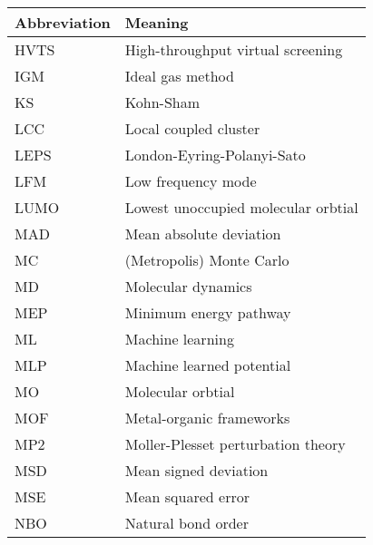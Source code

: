 \documentclass[../main.tex]{subfiles}
\begin{document}
\begin{table}[h!]
\def\arraystretch{2.0}
\begin{tabularx}{\textwidth}{YY}
Abbreviation & Meaning \\
\hline
HVTS	&	High-throughput virtual screening	\\
IGM	&	Ideal gas method	\\
KS	&	Kohn-Sham	\\
LCC	&	Local coupled cluster	\\
LEPS	&	London-Eyring-Polanyi-Sato	\\
LFM	&	Low frequency mode	\\
LUMO	&	Lowest unoccupied molecular orbtial	\\
MAD	&	Mean absolute deviation	\\
MC	&	(Metropolis) Monte Carlo	\\
MD	&	Molecular dynamics	\\
MEP	&	Minimum energy pathway	\\
ML	&	Machine learning	\\
MLP	&	Machine learned potential	\\
MO	&	Molecular orbtial	\\
MOF	&	Metal-organic frameworks	\\
MP2	&	Moller-Plesset perturbation theory	\\
MSD	&	Mean signed deviation	\\
MSE	&	Mean squared error	\\
NBO	&	Natural bond order	\\
\end{tabularx}
\end{table}
\newpage
\end{document}
